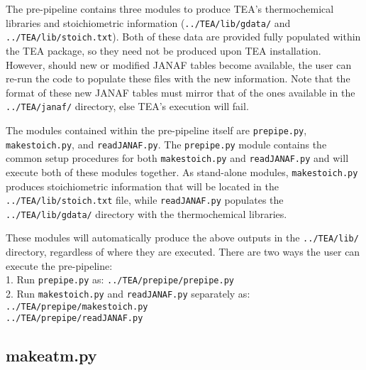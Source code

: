 {The pre-pipeline contains three modules to produce TEA's
thermochemical libraries and stoichiometric information
(\texttt{../TEA/lib/gdata/} and \texttt{../TEA/lib/stoich.txt}). Both
of these data are provided fully populated within the TEA package, so
they need not be produced upon TEA installation. However, should new
or modified JANAF tables become available, the user can re-run the
code to populate these files with the new information. Note that the
format of these new JANAF tables must mirror that of the ones
available in the
\texttt{../TEA/janaf/} directory, else TEA's execution will fail.

The modules contained within the pre-pipeline itself are
\texttt{prepipe.py}, \texttt{makestoich.py}, and
\texttt{readJANAF.py}. The \texttt{prepipe.py} module contains the
common setup procedures for both \texttt{makestoich.py} and
\texttt{readJANAF.py} and will execute both of these modules
together. As stand-alone modules, \texttt{makestoich.py} produces
stoichiometric information that will be located in the
\texttt{../TEA/lib/stoich.txt} file, while \texttt{readJANAF.py}
populates the \newline \texttt{../TEA/lib/gdata/} directory with the
thermochemical libraries.

These modules will automatically produce the above outputs in
the \texttt{../TEA/lib/} directory, regardless of where they are
executed. There are two ways the user can execute the pre-pipeline:\\
1. Run \texttt{prepipe.py} as:
\texttt{../TEA/prepipe/prepipe.py}\\ 2. Run \texttt{makestoich.py} and
\texttt{readJANAF.py} separately as:\\ 
\texttt{../TEA/prepipe/makestoich.py}\\ 
\texttt{../TEA/prepipe/readJANAF.py}



\subsection{makeatm.py}
\label{exec-makeatm}

}
